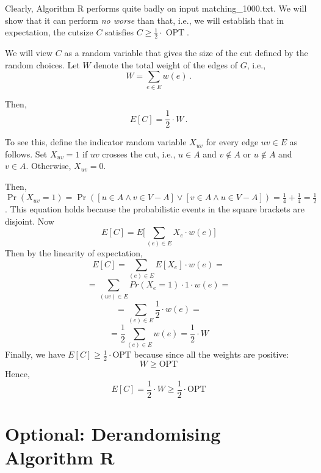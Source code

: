 \documentclass{tufte-handout}
\begin{document}
Clearly, Algorithm R performs quite badly on input 
  matching\_1000.txt.
We will show that it can perform \emph{no worse} than that, i.e., we
will establish that in expectation, the cutsize $C$ satisfies $C \geq
\frac{1}{2}\cdot \operatorname{OPT}$.\


We will view $C$ as a random variable that gives the size of the cut
defined by the random choices.
Let $W$ denote the total weight of the edges of $G$, i.e.,
\[ W= \sum_{e\in E} w(e)\,.\]

Then,
\begin{equation}\label{eq: E[C]}
E[C] = \textstyle\frac{1}{2}\cdot W\,.
\end{equation}

To see this, define the indicator random variable $X_{uv}$ for every
edge $uv\in E$ as follows.
Set $X_{uv}=1$ if $uv$ crosses the cut, i.e., $u\in A$ and $v\notin A$
or $u\notin A$ and $v\in A$.
Otherwise, $X_{uv} = 0$.

Then, $\Pr(X_{uv} = 1) = \Pr([u\in A \land v \in V-A] \lor  [v\in A \land u \in V-A])=\frac{1}{4}+\frac{1}{4}=\frac{1}{2}$. This equation holds because the probabilistic events in the square brackets are disjoint. Now
\begin{equation*}
	E[C]=E \Big [\sum_{(e)\in E}X_{e}\cdot w(e) \Big]
\end{equation*}
Then by the linearity of expectation,
\begin{equation*}
	E[C] = \sum_{(e)\in E}E[X_{e}]\cdot w(e) =
\end{equation*}
\begin{equation*}
	=\sum_{(uv) \in E} Pr(X_{e}=1)\cdot 1 \cdot w(e) =
\end{equation*}
\begin{equation*}
	=\sum_{(e) \in E} \frac{1}{2}\cdot w(e) =
\end{equation*}
\begin{equation*}
	=\frac{1}{2}\sum_{(e) \in E} w(e) =\frac{1}{2} \cdot W
\end{equation*}
Finally, we have 
\(E[C]\geq \frac1{2}\cdot \text{OPT}\) because since all the weights are positive:
\begin{equation*}
W \geq \text{OPT}
\end{equation*}
Hence,
\begin{equation*}
E[C] = \frac1{2} \cdot W \geq \frac1{2}\cdot \text{OPT}
\end{equation*}




\newpage
\section{Optional: Derandomising Algorithm R}
\end{document}
